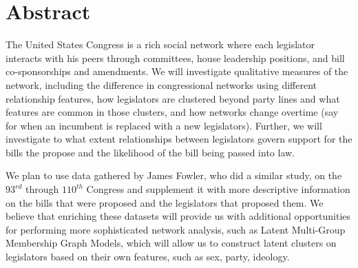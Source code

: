 \section{Abstract}

The United States Congress is a rich social network where each legislator 
interacts with his peers through committees, house leadership positions, and 
bill co-sponsorships and amendments. We will investigate qualitative measures 
of the network, including the difference in congressional networks using 
different relationship features, how legislators are clustered beyond party 
lines and what features are common in those clusters, and how networks change 
overtime (say for when an incumbent is replaced with a new legislators). 
Further, we will investigate to what extent relationships between legislators 
govern support for the bills the propose and the likelihood of the bill being 
passed into law.

We plan to use data gathered by James Fowler, who did a similar study, on the 
$93^{rd}$ through $110^{th}$ Congress and supplement it with more descriptive 
information on the bills that were proposed and the legislators that proposed 
them. We believe that enriching these datasets will provide us with additional 
opportunities for performing more sophisticated network analysis, such as 
Latent Multi-Group Membership Graph Models, which will allow us to construct 
latent clusters on legislators based on their own features, such as sex, 
party, ideology.
